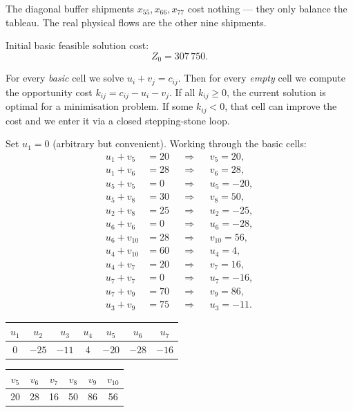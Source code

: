\begin{notebox}
The diagonal buffer shipments \(x_{55},x_{66},x_{77}\) cost nothing --- they only balance the
tableau. The real physical flows are the other nine shipments.
\end{notebox}

\begin{resultbox}[title={Part (c) --- ADBAM IBFS}]
Initial basic feasible solution cost:
\[
  Z_0 = 307\,750.
\]
\end{resultbox}


\begin{ideabox}
For every \emph{basic} cell we solve \(u_i+v_j=c_{ij}\). Then for every \emph{empty} cell we
compute the opportunity cost \(k_{ij}=c_{ij}-u_i-v_j\). If all \(k_{ij}\ge 0\), the current
solution is optimal for a minimisation problem. If some \(k_{ij}<0\), that cell can improve
the cost and we enter it via a closed stepping-stone loop.
\end{ideabox}

Set \(u_1=0\) (arbitrary but convenient). Working through the basic cells:
\begin{align*}
  u_1+v_5&=20 &&\Rightarrow && v_5=20,\\
  u_1+v_6&=28 &&\Rightarrow && v_6=28,\\
  u_5+v_5&=0 &&\Rightarrow && u_5=-20,\\
  u_5+v_8&=30 &&\Rightarrow && v_8=50,\\
  u_2+v_8&=25 &&\Rightarrow && u_2=-25,\\
  u_6+v_6&=0 &&\Rightarrow && u_6=-28,\\
  u_6+v_{10}&=28 &&\Rightarrow && v_{10}=56,\\
  u_4+v_{10}&=60 &&\Rightarrow && u_4=4,\\
  u_4+v_7&=20 &&\Rightarrow && v_7=16,\\
  u_7+v_7&=0 &&\Rightarrow && u_7=-16,\\
  u_7+v_9&=70 &&\Rightarrow && v_9=86,\\
  u_3+v_9&=75 &&\Rightarrow && u_3=-11.
\end{align*}

\begin{center}
\begin{tabular}{@{}ccccccc@{}}
\toprule
\(u_1\) & \(u_2\) & \(u_3\) & \(u_4\) & \(u_5\) & \(u_6\) & \(u_7\) \\
\midrule
0 & \(-25\) & \(-11\) & 4 & \(-20\) & \(-28\) & \(-16\) \\
\bottomrule
\end{tabular}
\qquad
\begin{tabular}{@{}cccccc@{}}
\toprule
\(v_5\) & \(v_6\) & \(v_7\) & \(v_8\) & \(v_9\) & \(v_{10}\) \\
\midrule
20 & 28 & 16 & 50 & 86 & 56 \\
\bottomrule
\end{tabular}
\end{center}

